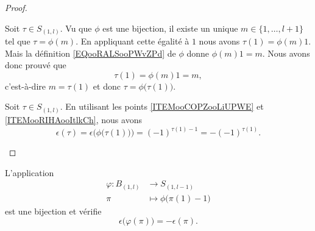 \begin{proof}
\begin{subproof}
		Soit \( \tau\in S_{(1,l)}\). Vu que \( \phi\) est une bijection, il existe un unique \( m\in \{ 1,\ldots,l+1 \}\) tel que \( \tau=\phi(m)\). En appliquant cette égalité à \( 1\) nous avons \( \tau(1)=\phi(m)1\). Mais la définition \eqref{EQooRALSooPWvZPd} de \( \phi\) donne \( \phi(m)1=m\). Nous avons donc prouvé que
		\begin{equation}
			\tau(1)=\phi(m)1=m,
		\end{equation}
		c'est-à-dire \( m=\tau(1)\) et donc \( \tau=\phi\big( \tau(1) \big)\).

		Soit \( \tau\in S_{(1,l)}\). En utilisant les points \ref{ITEMooCOPZooLiUPWE} et \ref{ITEMooRIHAooItlkCh}, nous avons
		\begin{equation}
			\epsilon(\tau)=\epsilon\Big( \phi\big( \tau(1) \big) \Big)=(-1)^{\tau(1)-1}=-(-1)^{\tau(1)}.
		\end{equation}
	\end{subproof}
\end{proof}

\begin{lemma}		\label{LEMooFHCHooQgrwHD}
	L'application
	\begin{equation}
		\begin{aligned}
			\varphi\colon B_{(1,l)} & \to S_{(1,l-1)}                  \\
			\pi                     & \mapsto \phi\big( \pi(1)-1 \big)
		\end{aligned}
	\end{equation}
	est une bijection et vérifie
	\begin{equation}
		\epsilon\big( \varphi(\pi) \big)=-\epsilon(\pi).
	\end{equation}
\end{lemma}

